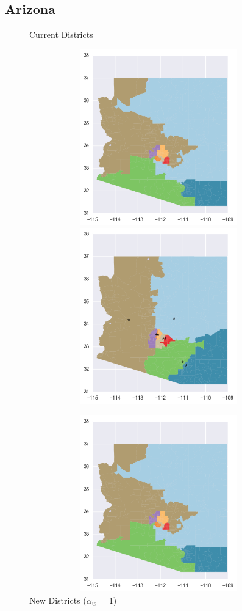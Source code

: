 \clearpage
\newpage

\subsection{Arizona}
\begin{figure}[htb!] \centering
\caption{ Current Districts }
\includegraphics[width=5in,height=3in,keepaspectratio]{../maps/AZ/static/before.png}
\includegraphics[width=5in,height=3in,keepaspectratio]{../maps/AZ/static/0_0_after.png}
\caption{ New Districts ($\alpha_w$ = 1) }
\includegraphics[width=5in,height=3in,keepaspectratio]{../maps/AZ/static/before.png}

\end{figure}
